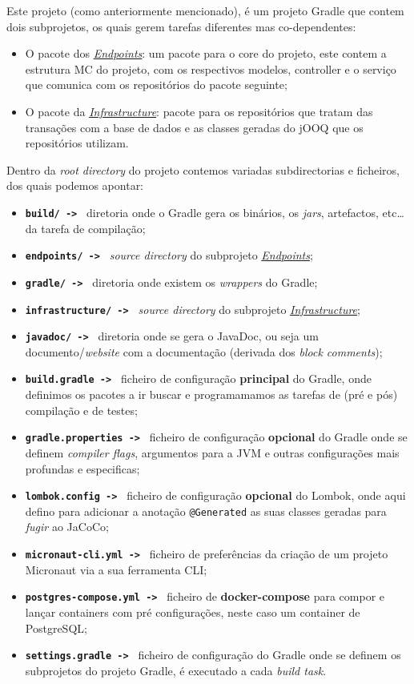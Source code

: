 Este projeto (como anteriormente mencionado), é um projeto Gradle que contem dois subprojetos, os quais gerem tarefas diferentes mas co-dependentes:

\begin{itemize}
  \item O pacote dos \hyperref[endp]{\textit{Endpoints}}: um pacote para o core do projeto, este contem a estrutura MC do projeto, com os respectivos modelos, controller e o serviço que comunica com os repositórios do pacote seguinte;
  \item O pacote da \hyperref[infra]{\textit{Infrastructure}}: pacote para os repositórios que tratam das transações com a base de dados e as classes geradas do jOOQ que os repositórios utilizam.
\end{itemize}

Dentro da \textit{root directory} do projeto contemos variadas subdirectorias e ficheiros, dos quais podemos apontar:

\begin{itemize}
  \item \texttt{\textbf{build/ -> }} diretoria onde o Gradle gera os binários, os \textit{jars}, artefactos, etc\ldots da tarefa de compilação;
  \item \texttt{\textbf{endpoints/ -> }} \textit{source directory} do subprojeto \hyperref[endp]{\textit{Endpoints}};
  \item \texttt{\textbf{gradle/ -> }} diretoria onde existem os \textit{wrappers} do Gradle;
  \item \texttt{\textbf{infrastructure/ -> }} \textit{source directory} do subprojeto \hyperref[infra]{\textit{Infrastructure}};
  \item \texttt{\textbf{javadoc/ -> }} diretoria onde se gera o JavaDoc, ou seja um documento/\textit{website} com a documentação (derivada dos \textit{block comments});
  \item \texttt{\textbf{build.gradle -> }} ficheiro de configuração \textbf{principal} do Gradle, onde definimos os pacotes a ir buscar e programamamos as tarefas de (pré e pós) compilação e de testes;
  \item \texttt{\textbf{gradle.properties -> }} ficheiro de configuração \textbf{opcional} do Gradle onde se definem \textit{compiler flags}, argumentos para a JVM e outras configurações mais profundas e especificas;
  \item \texttt{\textbf{lombok.config -> }} ficheiro de configuração \textbf{opcional} do Lombok, onde aqui defino para adicionar a anotação \texttt{@Generated} as suas classes geradas para \textit{fugir} ao JaCoCo;
  \item \texttt{\textbf{micronaut-cli.yml -> }} ficheiro de preferências da criação de um projeto Micronaut via a sua ferramenta CLI;
  \item \texttt{\textbf{postgres-compose.yml -> }} ficheiro de \textbf{docker-compose} para compor e lançar containers com pré configurações, neste caso um container de PostgreSQL;
  \item \texttt{\textbf{settings.gradle -> }} ficheiro de configuração do Gradle onde se definem os subprojetos do projeto Gradle, é executado a cada \textit{build task}.
\end{itemize}

